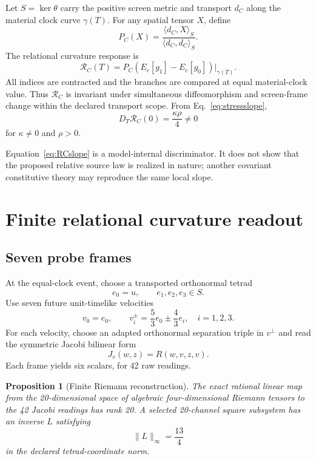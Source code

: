\documentclass[11pt]{article}
\newtheorem{proposition}[theorem]{Proposition}
\theoremstyle{definition}
\theoremstyle{remark}
\newcommand{\Ker}{\operatorname{ker}}
\newcommand{\RC}{\mathcal{R}_{C}}
\begin{document}
Let $S=\Ker\theta$ carry the positive screen metric and transport $d_C$ along the material clock curve $\gamma(T)$. For any spatial tensor $X$, define
\begin{equation}
  P_C(X)=\frac{\langle d_C,X\rangle_S}{\langle d_C,d_C\rangle_S}.
\end{equation}
The relational curvature response is
\begin{equation}\label{eq:RC}
  \RC(T)=P_C\!\left(E_c[g_1]-E_c[g_0]\right)\big|_{\gamma(T)}.
\end{equation}
All indices are contracted and the branches are compared at equal material-clock value. Thus $\RC$ is invariant under simultaneous diffeomorphism and screen-frame change within the declared transport scope. From Eq.~\eqref{eq:stressslope},
\begin{equation}\label{eq:RCslope}
  D_T\RC(0)=\frac{\kappa\rho}{4}\ne0
\end{equation}
for $\kappa\ne0$ and $\rho>0$.

Equation~\eqref{eq:RCslope} is a model-internal discriminator. It does not show that the proposed relative source law is realized in nature; another covariant constitutive theory may reproduce the same local slope.

\section{Finite relational curvature readout}

\subsection{Seven probe frames}

At the equal-clock event, choose a transported orthonormal tetrad
\begin{equation}
  e_0=u,\qquad e_1,e_2,e_3\in S.
\end{equation}
Use seven future unit-timelike velocities
\begin{equation}
  v_0=e_0,\qquad
  v_i^{\pm}=\frac53e_0\pm\frac43e_i,\quad i=1,2,3.
\end{equation}
For each velocity, choose an adapted orthonormal separation triple in $v^\perp$ and read the symmetric Jacobi bilinear form
\begin{equation}
  J_v(w,z)=R(w,v,z,v).
\end{equation}
Each frame yields six scalars, for 42 raw readings.

\begin{proposition}[Finite Riemann reconstruction]\label{prop:detector}
The exact rational linear map from the 20-dimensional space of algebraic four-dimensional Riemann tensors to the 42 Jacobi readings has rank 20. A selected 20-channel square subsystem has an inverse $L$ satisfying
\begin{equation}
  \|L\|_\infty=\frac{13}{4}
\end{equation}
in the declared tetrad-coordinate norm.
\end{proposition}
\end{document}
